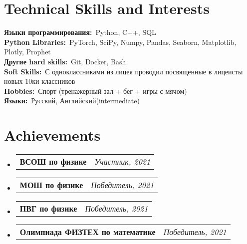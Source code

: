 \documentclass[a4paper,11pt]{article}
\makeatletter
\newcommand{\resumePOR}[3]{
\vspace{0.5mm}\item
    \begin{tabular*}{0.97\textwidth}[t]{l@{\extracolsep{\fill}}r}
        \textbf{#1}\hspace{0.3mm}#2 & \textit{\small{#3}} 
    \end{tabular*}
    \vspace{-2mm}
}
\newcommand{\resumeSubHeadingListStart}{\begin{itemize}[leftmargin=*,labelsep=0mm]}
\newcommand{\resumeSubHeadingListEnd}{\end{itemize}\vspace{2mm}}
\makeatother
\begin{document}
\section{\textbf{Technical Skills and Interests}}
 \begin{itemize}[leftmargin=0.1in, label={}]
    \small{\item{
     \textbf{Языки программирования:}{\ Python, C++, SQL} \\
     \textbf{Python Libraries:}{\ PyTorch, SciPy, Numpy, Pandas, Seaborn, Matplotlib, Plotly, Prophet} \\
    \textbf{Другие hard skills:}{\ Git, Docker, Bash} \\
     \textbf{Soft Skills:}{\ С одноклассниками из лицея проводил посвященные в лицеисты новых 10ки классников} \\
     \textbf{Hobbies:}{\ Спорт (тренажерный зал + бег + игры с мячом)} \\
     \textbf{Языки:}{\ Русский, Английский(intermediate)} \\
    }}
 
 \end{itemize}
 \vspace{-16pt}



    




\section{\textbf{Achievements}}
\vspace{-0.4mm}
\resumeSubHeadingListStart
\resumePOR{ВСОШ по физике} %
    {} %
    {Участник, 2021} %
    
\resumePOR{МОШ по физике} %
    {} %
    {Победитель, 2021} %
    
\resumePOR{ПВГ по физике} %
    {} %
    {Победитель, 2021} %
    
\resumePOR{Олимпиада ФИЗТЕХ по математике} %
    {} %
    {Победитель, 2021} %
\resumeSubHeadingListEnd
\vspace{-5mm}



\end{document}

